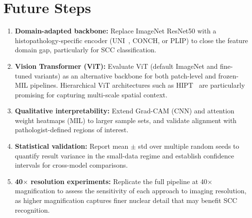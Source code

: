 \documentclass[10pt,twocolumn,letterpaper]{article}
\begin{document}
\section{Future Steps}
\label{sec:future}

\begin{enumerate}
\item \textbf{Domain-adapted backbone:} Replace ImageNet ResNet50 with a histopathology-specific encoder (UNI~\cite{chen2022}, CONCH, or PLIP) to close the feature domain gap, particularly for SCC classification.
\item \textbf{Vision Transformer (ViT):} Evaluate ViT (default ImageNet and fine-tuned variants) as an alternative backbone for both patch-level and frozen-MIL pipelines. Hierarchical ViT architectures such as HIPT~\cite{chen2022} are particularly promising for capturing multi-scale spatial context.
\item \textbf{Qualitative interpretability:} Extend Grad-CAM (CNN) and attention weight heatmaps (MIL) to larger sample sets, and validate alignment with pathologist-defined regions of interest.
\item \textbf{Statistical validation:} Report mean $\pm$ std over multiple random seeds to quantify result variance in the small-data regime and establish confidence intervals for cross-model comparisons.
\item \textbf{40$\times$ resolution experiments:} Replicate the full pipeline at 40$\times$ magnification to assess the sensitivity of each approach to imaging resolution, as higher magnification captures finer nuclear detail that may benefit SCC recognition.
\end{enumerate}

\end{document}
